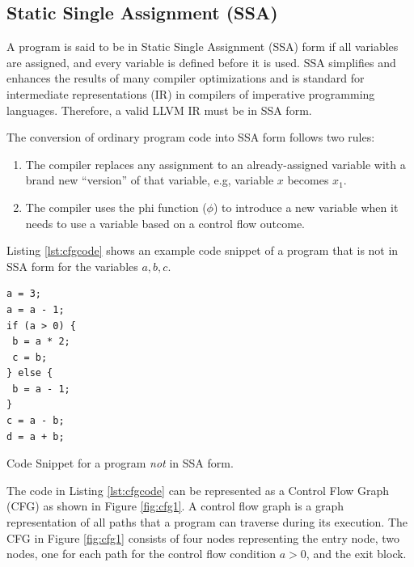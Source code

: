 \subsection{Static Single Assignment (SSA)}
A program is said to be in Static Single Assignment (SSA) \cite{ssa} form if all variables are assigned, and every variable is defined before it is used. SSA simplifies and enhances the results of many compiler optimizations and is standard for intermediate representations (IR) in compilers of imperative programming languages. Therefore, a valid LLVM IR must be in SSA form.

\noindent The conversion of ordinary program code into SSA form follows two rules:
\begin{enumerate}
    \item The compiler replaces any assignment to an already-assigned variable with a brand new “version” of that variable, e.g, variable \texttt{\textbf{$x$}} becomes \texttt{\textbf{$x_1$}}.
    \item The compiler uses the phi function ($\phi$) to introduce a new variable when it needs to use a variable based on a control flow outcome.
\end{enumerate}

Listing \ref{lst:cfgcode} shows an example code snippet of a program that is not in SSA form for the variables $a, b, c$.

\begin{listing}[htbp]
\begin{verbatim}
a = 3;
a = a - 1;
if (a > 0) {
 b = a * 2;
 c = b;
} else {
 b = a - 1;
}
c = a - b;
d = a + b;
\end{verbatim}
\caption{Code Snippet for a program \textit{not} in SSA form.}
\label{lst:cfgcode}
\end{listing}

The code in Listing \ref{lst:cfgcode} can be represented as a Control Flow Graph (CFG) as shown in Figure \ref{fig:cfg1}. A control flow graph is a graph representation of all paths that a program can traverse during its execution. The CFG in Figure \ref{fig:cfg1} consists of four nodes representing the entry node, two nodes, one for each path for the control flow condition $a > 0$, and the exit block.


